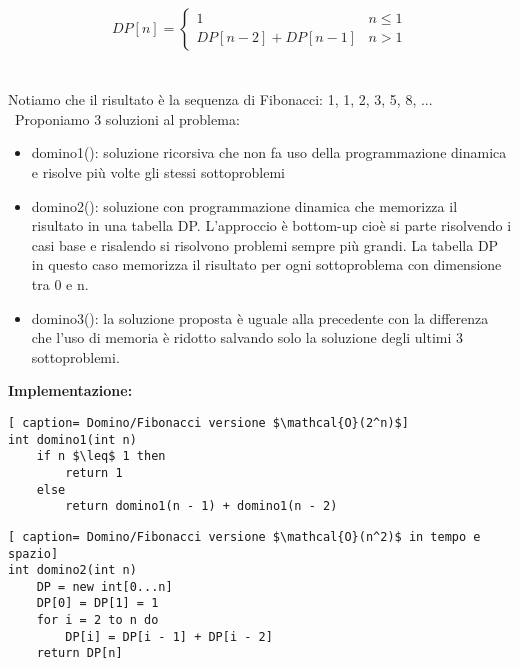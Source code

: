 \documentclass[../cheatSheetAlgoritmi.tex]{subfiles}
\begin{document}
\begin{equation*}
  	DP[n] =\begin{cases}
    	1 & \text{$n \leq 1$}\\
    	DP[n-2] + DP[n-1] & \text{$n > 1$}
  	\end{cases}
\end{equation*}\\\\
Notiamo che il risultato è la sequenza di Fibonacci: 1, 1, 2, 3, 5, 8, ... \
Proponiamo 3 soluzioni al problema:
\begin{itemize}
	\item domino1(): soluzione ricorsiva che non fa uso della programmazione dinamica e risolve più volte gli stessi sottoproblemi
	\item domino2(): soluzione con programmazione dinamica che memorizza il risultato in una tabella DP. L'approccio è bottom-up cioè si parte risolvendo i casi base e risalendo si risolvono problemi sempre più grandi. La tabella DP in questo caso memorizza il risultato per ogni sottoproblema con dimensione tra 0 e n.
	\item domino3(): la soluzione proposta è uguale alla precedente con la differenza che l'uso di memoria è ridotto salvando solo la soluzione degli ultimi 3 sottoproblemi. 
\end{itemize}
\newpage
\noindent
\textbf{Implementazione:}
\begin{lstlisting}[ caption= Domino/Fibonacci versione $\mathcal{O}(2^n)$]
int domino1(int n)
	if n $\leq$ 1 then
		return 1
	else
		return domino1(n - 1) + domino1(n - 2)
\end{lstlisting}

\begin{lstlisting}[ caption= Domino/Fibonacci versione $\mathcal{O}(n^2)$ in tempo e spazio]
int domino2(int n)
	DP = new int[0...n]
	DP[0] = DP[1] = 1
	for i = 2 to n do
		DP[i] = DP[i - 1] + DP[i - 2]
	return DP[n]
\end{lstlisting}
\end{document}
